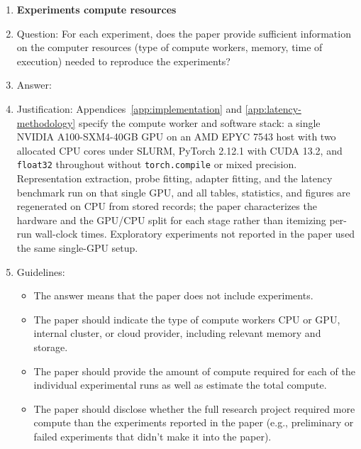\begin{enumerate}
\begin{itemize}
        \item It is OK to report 1-sigma error bars, but one should state it. The authors should preferably report a 2-sigma error bar than state that they have a 96\% CI, if the hypothesis of Normality of errors is not verified.
        \item For asymmetric distributions, the authors should be careful not to show in tables or figures symmetric error bars that would yield results that are out of range (e.g., negative error rates).
        \item If error bars are reported in tables or plots, the authors should explain in the text how they were calculated and reference the corresponding figures or tables in the text.
    \end{itemize}

\item {\bf Experiments compute resources}
    \item[] Question: For each experiment, does the paper provide sufficient information on the computer resources (type of compute workers, memory, time of execution) needed to reproduce the experiments?
    \item[] Answer: \answerYes{}
    \item[] Justification: Appendices~\ref{app:implementation} and \ref{app:latency-methodology} specify the compute worker and software stack: a single NVIDIA A100-SXM4-40GB GPU on an AMD EPYC 7543 host with two allocated CPU cores under SLURM, PyTorch 2.12.1 with CUDA 13.2, and \texttt{float32} throughout without \texttt{torch.compile} or mixed precision. Representation extraction, probe fitting, adapter fitting, and the latency benchmark run on that single GPU, and all tables, statistics, and figures are regenerated on CPU from stored records; the paper characterizes the hardware and the GPU/CPU split for each stage rather than itemizing per-run wall-clock times. Exploratory experiments not reported in the paper used the same single-GPU setup.
    \item[] Guidelines:
    \begin{itemize}
        \item The answer \answerNA{} means that the paper does not include experiments.
        \item The paper should indicate the type of compute workers CPU or GPU, internal cluster, or cloud provider, including relevant memory and storage.
        \item The paper should provide the amount of compute required for each of the individual experimental runs as well as estimate the total compute. 
        \item The paper should disclose whether the full research project required more compute than the experiments reported in the paper (e.g., preliminary or failed experiments that didn't make it into the paper). 
    \end{itemize}
    

\end{enumerate}
